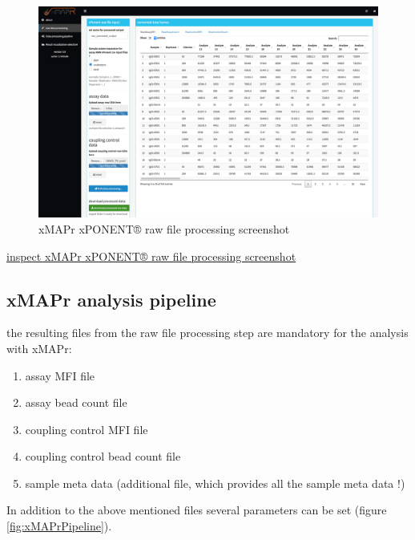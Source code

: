 \documentclass[]{book}
\providecommand{\tightlist}{%
  \setlength{\itemsep}{0pt}\setlength{\parskip}{0pt}}
\theoremstyle{definition}
\theoremstyle{definition}
\theoremstyle{definition}
\theoremstyle{remark}
\begin{document}
\begin{figure}

{\centering \includegraphics[width=50.58in]{figures/xPONENT_raw_file_processing} 

}

\caption{xMAPr xPONENT® raw file  processing screenshot}\label{fig:xMAPrxPONENT}
\end{figure}

\href{figures/xPONENT_raw_file_processing.png}{inspect xMAPr xPONENT®
raw file processing screenshot}

\subsection{xMAPr analysis pipeline}\label{xmapr-analysis-pipeline}

the resulting files from the raw file processing step are mandatory for
the analysis with xMAPr:

\begin{enumerate}
\def\labelenumi{\arabic{enumi}.}
\tightlist
\item
  assay MFI file
\item
  assay bead count file
\item
  coupling control MFI file
\item
  coupling control bead count file
\item
  sample meta data (additional file, which provides all the sample meta
  data !)
\end{enumerate}

In addition to the above mentioned files several parameters can be set
(figure \ref{fig:xMAPrPipeline}).
\end{document}
